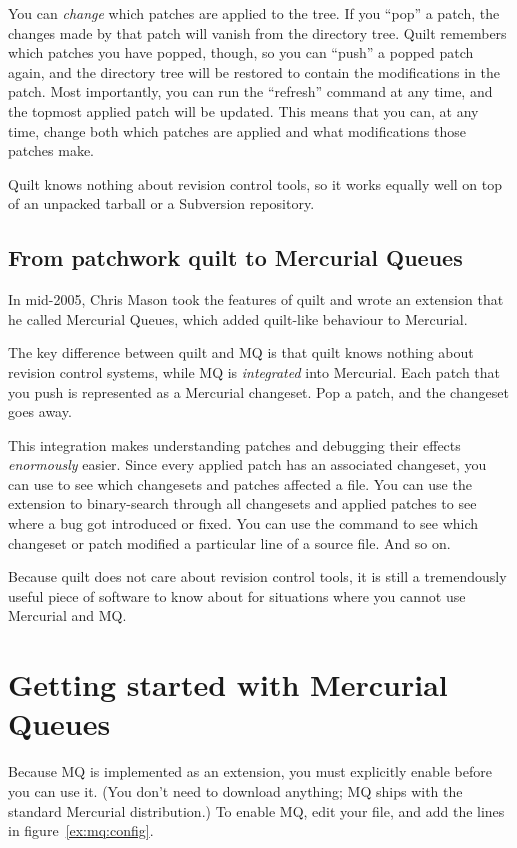 You can \emph{change} which patches are applied to the tree.  If you
``pop'' a patch, the changes made by that patch will vanish from the
directory tree.  Quilt remembers which patches you have popped,
though, so you can ``push'' a popped patch again, and the directory
tree will be restored to contain the modifications in the patch.  Most
importantly, you can run the ``refresh'' command at any time, and the
topmost applied patch will be updated.  This means that you can, at
any time, change both which patches are applied and what
modifications those patches make.

Quilt knows nothing about revision control tools, so it works equally
well on top of an unpacked tarball or a Subversion repository.

\subsection{From patchwork quilt to Mercurial Queues}
\label{sec:mq:quilt-mq}

In mid-2005, Chris Mason took the features of quilt and wrote an
extension that he called Mercurial Queues, which added quilt-like
behaviour to Mercurial.

The key difference between quilt and MQ is that quilt knows nothing
about revision control systems, while MQ is \emph{integrated} into
Mercurial.  Each patch that you push is represented as a Mercurial
changeset.  Pop a patch, and the changeset goes away.

This integration makes understanding patches and debugging their
effects \emph{enormously} easier.  Since every applied patch has an
associated changeset, you can use  to
see which changesets and patches affected a file.  You can use the
 extension to binary-search through all changesets and
applied patches to see where a bug got introduced or fixed.  You can
use the  command to see which changeset or patch
modified a particular line of a source file.  And so on.

Because quilt does not care about revision control tools, it is still
a tremendously useful piece of software to know about for situations
where you cannot use Mercurial and MQ.
\section{Getting started with Mercurial Queues}
\label{sec:mq:start}

Because MQ is implemented as an extension, you must explicitly enable
before you can use it.  (You don't need to download anything; MQ ships
with the standard Mercurial distribution.)  To enable MQ, edit your
 file, and add the lines in figure~\ref{ex:mq:config}.

